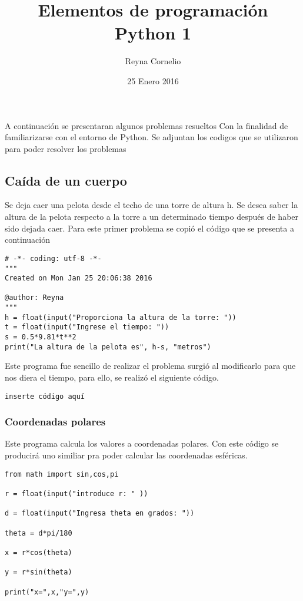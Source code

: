 \documentclass[12pt]{article}
\begin{document}
\title{Elementos de programación Python 1}
\author{Reyna Cornelio}
\date{25 Enero 2016}
\maketitle



 
 A continuación se presentaran algunos problemas resueltos  Con la finalidad de familiarizarse con el entorno de Python. Se adjuntan los codigos que se utilizaron para poder resolver los problemas
 
\subsection*{Caída de un cuerpo} 

Se deja caer una pelota desde el techo de una torre de altura h. Se desea saber la altura de la pelota respecto a la torre a un determinado tiempo después de haber sido dejada caer.
Para este primer problema se copió el código que se presenta a continuación

\begin{verbatim}
# -*- coding: utf-8 -*-
"""
Created on Mon Jan 25 20:06:38 2016

@author: Reyna
"""
h = float(input("Proporciona la altura de la torre: "))
t = float(input("Ingrese el tiempo: "))
s = 0.5*9.81*t**2
print("La altura de la pelota es", h-s, "metros")

\end{verbatim}

Este programa fue sencillo de realizar el problema surgió al modificarlo para que nos diera el tiempo, para ello, se realizó el siguiente código.

\begin{verbatim}
inserte código aquí
\end{verbatim}




\subsubsection*{Coordenadas polares}
Este programa calcula los valores a coordenadas polares. Con este código se producirá uno similiar pra poder calcular las coordenadas esféricas.
\begin{verbatim}
from math import sin,cos,pi

r = float(input("introduce r: " ))

d = float(input("Ingresa theta en grados: "))

theta = d*pi/180

x = r*cos(theta)

y = r*sin(theta)

print("x=",x,"y=",y)
\end{verbatim}
\end{document}
